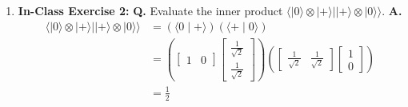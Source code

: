 \documentclass[main.tex]{subfiles}
\begin{document}
\begin{enumerate}
\item[] \textbf{In-Class Exercise 2:} \textbf{Q.} Evaluate the inner product $\langle|0\rangle \otimes|+\rangle||+\rangle \otimes|0\rangle\rangle$. \textbf{A.}
    \begin{align*}
        \langle|0\rangle \otimes|+\rangle
        ||+\rangle \otimes|0\rangle\rangle      & = (\langle 0 \mid + \rangle)(\langle + \mid 0\rangle)\\
                                                & = \left(\left[\begin{array}{ll} 1 & 0 \end{array}\right]
                                                \left[\begin{array}{l} \frac{1}{\sqrt{2}} \\ \frac{1}{\sqrt{2}} \end{array}\right]\right)
                                                \left(\left[\begin{array}{ll} \frac{1}{\sqrt{2}} & \frac{1}{\sqrt{2}} \end{array}\right]
                                                \left[\begin{array}{l} 1 \\ 0 \end{array}\right]\right)\\
                                                & = \frac{1}{2}
    \end{align*}
    

\end{enumerate}
\end{document}
